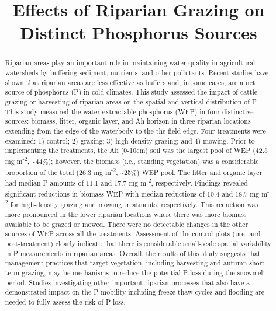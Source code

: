 \documentclass[
]{agujournal2019}
\begin{document}
\title{Effects of Riparian Grazing on Distinct Phosphorus Sources}



\begin{abstract}
Riparian areas play an important role in maintaining water quality in
agricultural watersheds by buffering sediment, nutrients, and other
pollutants. Recent studies have shown that riparian areas are less
effective as buffers and, in some cases, are a net source of phosphorus
(P) in cold climates. This study assessed the impact of cattle grazing
or harvesting of riparian areas on the spatial and vertical distribution
of P. This study measured the water-extractable phosphorus (WEP) in four
distinctive sources: biomass, litter, organic layer, and Ah horizon in
three riparian locations extending from the edge of the waterbody to the
the field edge. Four treatments were examined: 1) control; 2) grazing;
3) high density grazing; and 4) mowing. Prior to implementing the
treatments, the Ah (0-10cm) soil was the largest pool of WEP (42.5 mg
m\textsuperscript{-2}, \textasciitilde44\%); however, the biomass (i.e.,
standing vegetation) was a considerable proportion of the total (26.3 mg
m\textsuperscript{-2}, \textasciitilde25\%) WEP pool. The litter and
organic layer had median P amounts of 11.1 and 17.7 mg
m\textsuperscript{-2}, respectively. Findings revealed significant
reductions in biomass WEP with median reductions of 10.4 and 18.7 mg
m\textsuperscript{-2} for high-density grazing and mowing treatments,
respectively. This reduction was more pronounced in the lower riparian
locations where there was more biomass available to be grazed or mowed.
There were no detectable changes in the other sources of WEP across all
the treatments. Assessment of the control plots (pre- and
post-treatment) clearly indicate that there is considerable small-scale
spatial variability in P measurements in riparian areas. Overall, the
results of this study suggests that management practices that target
vegetation, including harvesting and autumn short-term grazing, may be
mechanisms to reduce the potential P loss during the snowmelt period.
Studies investigating other important riparian processes that also have
a demonstrated impact on the P mobility including freeze-thaw cycles and
flooding are needed to fully assess the risk of P loss.
\end{abstract}
\end{document}
